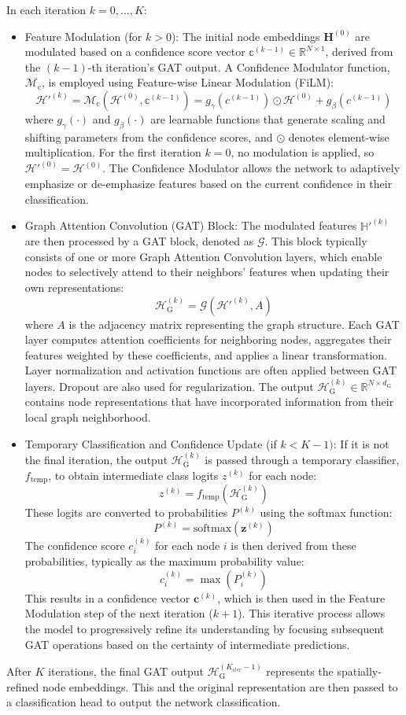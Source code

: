 In each iteration \(k = 0, \dots, K\):
\begin{itemize}
    \item Feature Modulation (for \(k > 0\)):
      The initial node embeddings $\mathbf{H}^{(0)}$ are modulated based on a confidence score vector \(\mathbb{c}^{(k-1)} \in \mathbb{R}^{N \times 1}\), derived from the \((k-1)\)-th iteration's GAT output. A Confidence Modulator function, $\mathcal{M}_{\text{c}}$, is employed using Feature-wise Linear Modulation (FiLM):
      \[\mathcal{H}'^{(k)} = \mathcal{M}_{\text{c}}(\mathcal{H}^{(0)}, \mathbb{c}^{(k-1)}) = g_{\gamma}(c^{(k-1)}) \odot \mathcal{H}^{(0)} + g_{\beta}(c^{(k-1)})\]
    where \(g_{\gamma}(\cdot)\) and \(g_{\beta}(\cdot)\) are learnable functions that generate scaling and shifting parameters from the confidence scores, and \(\odot\) denotes element-wise multiplication. For the first iteration \(k=0\), no modulation is applied, so \(\mathcal{H}'^{(0)} = \mathcal{H}^{(0)}\). The Confidence Modulator allows the network to adaptively emphasize or de-emphasize features based on the current confidence in their classification.

    \item Graph Attention Convolution (GAT) Block:
    The modulated features \(\mathbb{H}'^{(k)}\) are then processed by a GAT block, denoted as \(\mathcal{G}\). This block typically consists of one or more Graph Attention Convolution layers, which enable nodes to selectively attend to their neighbors' features when updating their own representations:
\[\mathcal{H}_{\text{G}}^{(k)} = \mathcal{G}(\mathcal{H}'^{(k)}, A)\]
    where \(A\) is the adjacency matrix representing the graph structure. Each GAT layer computes attention coefficients for neighboring nodes, aggregates their features weighted by these coefficients, and applies a linear transformation. Layer normalization and activation functions  are often applied between GAT layers. Dropout are also used for regularization. The output \(\mathcal{H}_{\text{G}}^{(k)} \in \mathbb{R}^{N \times d_{\text{G}}}\) contains node representations that have incorporated information from their local graph neighborhood.

    \item Temporary Classification and Confidence Update (if \(k < K-1)\):
    If it is not the final iteration, the output \(\mathcal{H}_{\text{G}}^{(k)}\) is passed through a temporary classifier, \(f_{\text{temp}}\), to obtain intermediate class logits \(z^{(k)}\) for each node:
    \[z^{(k)} = f_{\text{temp}}(\mathcal{H}_{\text{G}}^{(k)})\]
    These logits are converted to probabilities $P^{(k)}$ using the softmax function:
    \[P^{(k)} = \text{softmax}(\mathbf{z}^{(k)}) \]
    The confidence score $c_i^{(k)}$ for each node $i$ is then derived from these probabilities, typically as the maximum probability value:
    \[ c_i^{(k)} = \max(P_i^{(k)}) \]
    This results in a confidence vector $\mathbf{c}^{(k)}$, which is then used in the Feature Modulation step of the next iteration ($k+1$). This iterative process allows the model to progressively refine its understanding by focusing subsequent GAT operations based on the certainty of intermediate predictions.
\end{itemize}

After \(K\) iterations, the final GAT output $\mathcal{H}_{\text{G}}^{(K_{iter}-1)}$ represents the spatially-refined node embeddings. This and the original representation are then passed to a classification head to output the network classification.
